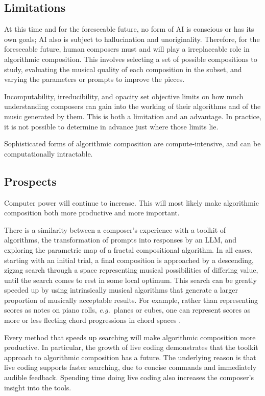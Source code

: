 \documentclass[11pt,papersize=a4]{scrartcl}
\begin{document}
\subsection*{Limitations}

At this time and for the foreseeable future, no form of AI is conscious or has its own goals; AI also is subject to hallucination and unoriginality. Therefore, for the foreseeable future, human composers must and will play a irreplaceable role in algorithmic composition. This involves selecting a set of possible compositions to study, evaluating the musical quality of each composition in the subset, and varying the parameters or prompts to improve  the pieces.

Incomputability, irreducibility, and opacity set objective limits on how much understanding composers can gain into the working of their algorithms and of the music generated by them. This is both a limitation and an advantage. In practice, it is not possible to determine in advance just where those limits lie.

Sophisticated forms of algorithmic composition are compute-intensive, and can be computationally intractable.

\subsection*{Prospects}

Computer power will continue to increase. This will most likely make algorithmic composition both more productive and more important.

There is a similarity between a composer's experience with a toolkit of algorithms, the transformation of prompts into responses by an LLM, and exploring the parametric map of a fractal compositional algorithm. In all cases, starting with an initial trial, a final composition is approached by a descending, zigzag search through a space representing musical possibilities of differing value, until the search comes to rest in some local optimum. This search can be greatly speeded up by using intrinsically musical algorithms that generate a larger proportion of musically acceptable results. For example, rather than representing scores as notes on piano rolls, \emph{e.g.}\ planes or cubes, one can represent scores as more or less fleeting chord progressions in chord spaces \parencite{gogins2006score, gogins2023scoregraphs}.

Every method that speeds up searching will make algorithmic composition more productive. In particular, the growth of live coding demonstrates that the toolkit approach to algorithmic composition has a future. The underlying reason is that live coding supports faster searching, due to concise commands and immediately audible feedback. Spending time doing live coding also increases the composer's insight into the tools.
\end{document}

